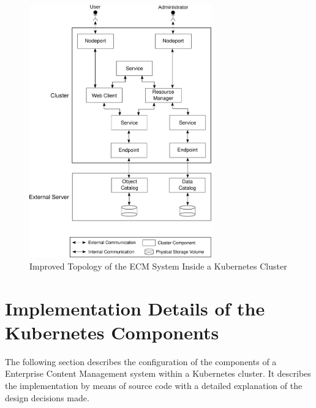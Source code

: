 \begin{figure}[h]
    \centering
    \includegraphics[width=0.7\textwidth]{graphics/improved_topology.svg}
    \caption{Improved Topology of the ECM System Inside a Kubernetes Cluster}
    \label{fig:improv_topology}
\end{figure}

\section{Implementation Details of the Kubernetes Components}
The following section describes the configuration of the components of a Enterprise Content Management system within a Kubernetes cluster.
It describes the implementation by means of source code with a detailed explanation of the design decisions made.

